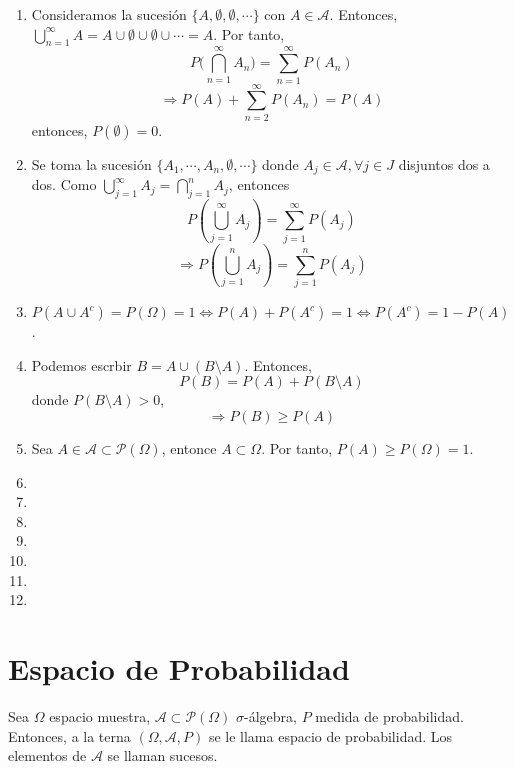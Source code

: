 \begin{dem}
  \begin{enumerate}[label=(\roman*)]
    \item Consideramos la sucesión $\{ A, \emptyset, \emptyset, \cdots \}$ con $A \in \mathcal{A}$. Entonces, $\bigcup_{n=1}^{\infty} A = A \cup \emptyset \cup \emptyset \cup \cdots = A$. Por tanto,
      \[ 
        P \Big ( \bigcap_{n = 1}^{\infty} A_{n} \Big ) = \sum_{n = 1}^{\infty} P(A_{n})
      \] 
      \[ 
        \Rightarrow P(A) + \sum_{n = 2}^{\infty} P(A_{n}) = P(A) 
      \]  
      entonces, $P(\emptyset) = 0$.
    \item Se toma la sucesión $\{ A_{1}, \cdots, A_{n}, \emptyset, \cdots \}$ donde $A_{j} \in \mathcal{A}, \forall j \in J$ disjuntos dos a dos. Como $\bigcup_{j = 1}^{\infty} A_{j} = \bigcap_{j = 1}^{n} A_{j} $, entonces
      \[ 
        P(\bigcup_{j = 1}^{\infty} A_{j}) = \sum_{j = 1}^{\infty} P(A_{j})
      \] 
      \[ 
        \Rightarrow P(\bigcup_{j = 1}^{n} A_{j}) = \sum_{j = 1}^{n} P(A_{j})
      \] 
    \item $P(A \cup A^{c}) = P(\Omega) = 1 \Leftrightarrow P(A) + P(A^{c}) = 1 \Leftrightarrow P(A^{c}) = 1 - P(A)$.
    \item Podemos escrbir $B = A \cup (B \setminus A)$. Entonces,
      \[ 
        P(B) = P(A) + P(B \setminus A) 
      \] 
      donde $P(B \setminus A) > 0$,
      \[ 
         \Rightarrow P(B) \geq P(A) 
      \] 
    \item Sea $A \in \mathcal{A} \subset \mathcal{P}(\Omega)$, entonce $A \subset \Omega$. Por tanto, $P(A) \geq P(\Omega) = 1$.
    \item 
    \item 
    \item 
    \item 
    \item 
    \item 
    \item 
  \end{enumerate}
\end{dem}

\section{Espacio de Probabilidad}

\begin{defn}
  Sea $\Omega$ espacio muestra, $\mathcal{A} \subset \mathcal{P}(\Omega)$ $\sigma$-álgebra, $P$ medida de probabilidad. Entonces, a la terna $(\Omega, \mathcal{A}, P)$ se le llama espacio de probabilidad. Los elementos de $\mathcal{A}$ se llaman sucesos.
\end{defn}

